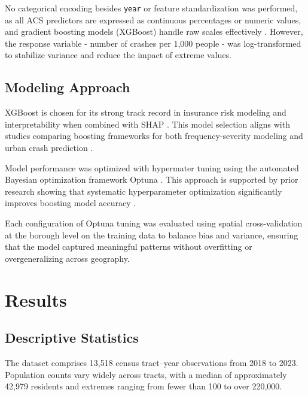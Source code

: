 \documentclass[
  number,
  review,
  3p]{elsarticle}
\begin{document}
No categorical encoding besides \texttt{year} or feature standardization
was performed, as all ACS predictors are expressed as continuous
percentages or numeric values, and gradient boosting models (XGBoost)
handle raw scales effectively \citep{henckaerts}. However, the response
variable - number of crashes per 1,000 people - was log-transformed to
stabilize variance and reduce the impact of extreme values.

\subsection{\texorpdfstring{\textbf{Modeling
Approach}}{Modeling Approach}}\label{modeling-approach}

XGBoost \citep{xgboost} is chosen for its strong track record in
insurance risk modeling and interpretability when combined with SHAP
\citep{dong}. This model selection aligns with studies comparing
boosting frameworks for both frequency-severity modeling
\citep{henckaerts} and urban crash prediction \citep{adeniyi}.

Model performance was optimized with hypermater tuning using the
automated Bayesian optimization framework Optuna \citep{optuna}. This
approach is supported by prior research showing that systematic
hyperparameter optimization significantly improves boosting model
accuracy \citep{liu}.

Each configuration of Optuna tuning was evaluated using spatial
cross-validation at the borough level on the training data to balance
bias and variance, ensuring that the model captured meaningful patterns
without overfitting or overgeneralizing across geography.

\section{Results}\label{results}

\subsection{\texorpdfstring{\textbf{Descriptive
Statistics}}{Descriptive Statistics}}\label{descriptive-statistics}

The dataset comprises 13,518 census tract--year observations from 2018
to 2023. Population counts vary widely across tracts, with a median of
approximately 42,979 residents and extremes ranging from fewer than 100
to over 220,000.
\end{document}
